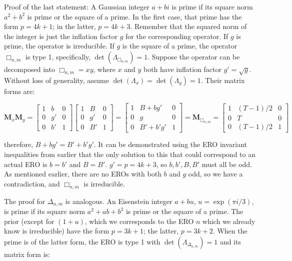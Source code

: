\documentclass[12pt]{amsart}%
\begin{document}
Proof of the last statement: A Gaussian integer $a + bi$ is prime if its
square norm $a^2 + b^2$ is prime or the square of a prime. In the first
case, that prime has the form $p=4k+1$; in the latter, $p=4k+3$.
Remember that the squared norm of the integer is just the inflation factor $g$
for the corresponding operator. If $g$ is prime, the operator is irreducible.
If $g$ is the square of a prime, the operator $\Box_{n,m}$ is type 1,
specifically, $\det(\Lambda_{\Box_{n,m}}) = 1$. Suppose the operator can
be decomposed into $\Box_{n,m} = xy$, where $x$ and $y$ both have
inflation factor $g' = \sqrt{g}$. Without loss of generality, assume
$\det(\Lambda_x) = \det(\Lambda_y) = 1$. Their matrix forms are:

\begin{equation}
   \mathbf{M}_x \mathbf{M}_y = \begin{bmatrix}
   1 & b & 0 \\
   0 & g' & 0 \\
   0 & b' & 1 \end{bmatrix} \begin{bmatrix}
   1 & B & 0 \\
   0 & g' & 0 \\
   0 & B' & 1 \end{bmatrix}
   = \begin{bmatrix}
   1 & B+bg' & 0 \\
   0 & g & 0 \\
   0 & B'+b'g' & 1 \end{bmatrix}
   = \mathbf{M}_{\Box_{n,m}} = \begin{bmatrix}
   1 & (T-1)/2 & 0 \\
   0 & T & 0 \\
   0 & (T-1)/2 & 1 \end{bmatrix}
\end{equation}

therefore, $B+bg' = B'+b'g'$. It can be demonstrated using the ERO
invariant inequalities from earlier that the only solution to this that could
correspond to an actual ERO is $b=b'$ and $B=B'$.
$g' = p = 4k + 3$, so $b, b', B, B'$ must all be odd. As mentioned
earlier, there are no EROs with both $b$ and $g$ odd, so we have a
contradiction, and $\Box_{n,m}$ is irreducible.

The proof for $\Delta_{n,m}$ is analogous. An Eisenstein integer
$a + bu$, $u=\exp(\pi i/3)$, is prime if its square norm
$a^2 + ab + b^2$ is prime or the square of a prime. The prior (except
for $(1 + u)$, which we corresponds to the ERO $n$ which we already
know is irreducible) have the form $p=3k+1$; the latter, $p=3k+2$.
When the prime is of the latter form, the ERO is type 1 with
$\det(\Lambda_{\Delta_{n,m}}) = 1$ and its matrix form is:
\end{document}
